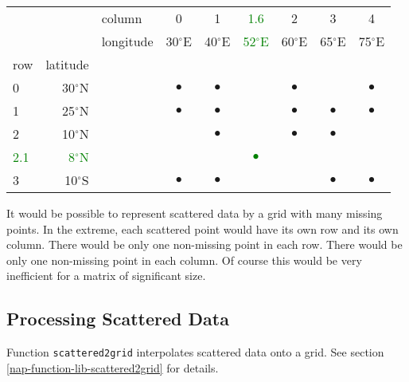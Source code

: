     \begin{tabular}{|lrl|cccccc|}
      \hline 
         & 
         & 
        column & 
        0 & 
        1 & 
	\textcolor{green}{1.6}
         & 
        2 & 
        3 & 
        4
      \\
         & 
         & 
        longitude & 
        30$^{\circ}$E & 
        40$^{\circ}$E & 
	\textcolor{green}{52$^{\circ}$E}
         & 
        60$^{\circ}$E & 
        65$^{\circ}$E & 
        75$^{\circ}$E
      \\
        row & 
        latitude
         & 
         & 
         & 
         & 
         & 
         & 
         & 
      \\
      \hline 
        0 & 
        30$^{\circ}$N & 
         & 
        $\bullet$ & 
        $\bullet$ & 
         & 
        $\bullet$ & 
	& 
        $\bullet$
      \\
        1 & 
        25$^{\circ}$N & 
         & 
        $\bullet$ & 
        $\bullet$ & 
         & 
        $\bullet$ & 
        $\bullet$ & 
        $\bullet$ 
      \\
        2 & 
        10$^{\circ}$N & 
         & 
         & 
        $\bullet$ & 
         & 
        $\bullet$ & 
        $\bullet$ & 
      \\
	\textcolor{green}{2.1}
         & 
	\textcolor{green}{8$^{\circ}$N}
         & 
         & 
         & 
         & 
\textcolor{green}{$\bullet$}
         & 
         & 
         & 
      \\
        3 & 
        10$^{\circ}$S & 
         & 
        $\bullet$ & 
        $\bullet$ & 
         & 
         & 
        $\bullet$ & 
        $\bullet$
      \\
      \hline 
\end{tabular}

It would be possible to represent scattered data by a grid with
  many missing points. In the extreme, each scattered point would have
  its own row and its own column. There would be only one non-missing
  point in each row. There would be only one non-missing point in each
  column. Of course this would be very inefficient for a matrix of
  significant size.

\subsection{Processing Scattered Data}
    \label{grid-Scattered}

Function 
{\texttt{scattered2grid} } interpolates scattered data onto a grid.
See section
  \ref{nap-function-lib-scattered2grid}
for details.

